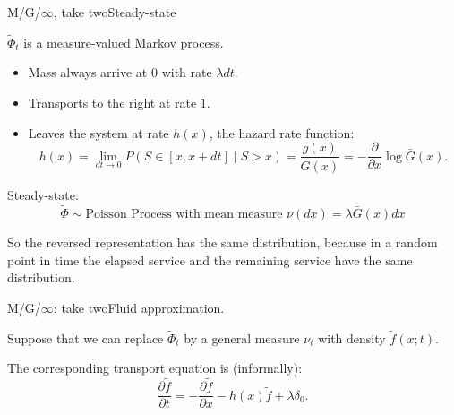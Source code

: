 \documentclass[aspectratio=169]{beamer}
\begin{document}
\begin{frame}{M/G/$\infty$, take two}{Steady-state}
	
	$\tilde\Phi_t$ is a measure-valued Markov process.

	\begin{itemize}
		\item Mass always arrive at $0$ with rate $\lambda dt$.
		\item Transports to the right at rate $1$.
		\item Leaves the system at rate $h(x)$, the \alert{hazard rate function}:
		\begin{equation*}
			h(x) = \lim_{dt\to 0} P(S\in[x,x+dt]\mid S>x) = \frac{g(x)}{\bar{G}(x)} = -\frac{\partial}{\partial x} \log \bar{G}(x).
		\end{equation*}
	\end{itemize}

	\pause
	\vfill
	\alert{Steady-state:}
		\begin{equation*}
			\tilde\Phi \sim \textrm{Poisson Process with mean measure } \nu(dx) = \lambda \bar{G}(x)dx
		\end{equation*}
	
	
	\vfill

	So the reversed representation has the same distribution, because in a random point in time the elapsed service and the remaining service have the same distribution.

\end{frame}


\begin{frame}{M/G/$\infty$: take two}{Fluid approximation.}
	
	Suppose that we can replace $\tilde\Phi_t$ by a general measure $\nu_t$ with density $\tilde f(x;t)$. 
	
	\begin{center}
	\end{center}
\vfill
\pause
The corresponding transport equation is (informally):
	\begin{equation*}
		\frac{\partial \tilde f}{\partial t} = -\frac{\partial \tilde f}{\partial x} - h(x)\tilde{f} + \lambda \delta_0.
	\end{equation*}
\end{frame}
\end{document}
